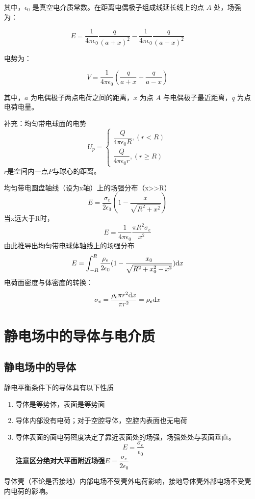 其中，$\epsilon_0$ 是真空电介质常数。在距离电偶极子组成线延长线上的点 $A$ 处，场强为：

$$ E = \frac{1}{4\pi\epsilon_0}\frac{q}{(a+x)^2} - \frac{1}{4\pi\epsilon_0}\frac{q}{(a-x)^2} $$

电势为：

$$ V = \frac{1}{4\pi\epsilon_0} \left( \frac{q}{a+x}+ \frac{q}{a-x}\right) $$

其中，$a$ 为电偶极子两点电荷之间的距离，$x$ 为点 $A$ 与电偶极子最近距离，$q$ 为点电荷电量。

补充：均匀带电球面的电势\\
\begin{equation}\label{key}
	U_p=
	\begin{cases}
		\dfrac{Q}{4\pi \epsilon_0 R},(r<R)\\
		\dfrac{Q}{4\pi \epsilon_0 r},(r\geq R)
	\end{cases}
\end{equation}
$r$是空间内一点$P$与球心的距离。

均匀带电圆盘轴线（设为x轴）上的场强分布（x>>R）
\begin{equation}\label{key}
	E=\dfrac{\sigma_e}{2\epsilon_0}(1-\dfrac{x}{\sqrt{R^2+x^2}})
\end{equation}
当x远大于R时，
\begin{equation}\label{key}
E=\dfrac{1}{4\pi \epsilon_0}\dfrac{\pi R^2\sigma_e}{x^2}
\end{equation}
由此推导出均匀带电球体轴线上的场强分布
\begin{equation}\label{key}
	E=\int_{-R}^{R}\dfrac{\rho_e}{2\epsilon_0}(1-\dfrac{x_0}{\sqrt{R^2+x_0^2-x^2}})\mathrm{d} x
\end{equation}
电荷面密度与体密度的转换：
\begin{equation}\label{key}
	\sigma_e=\dfrac{\rho_e \pi r^2 \mathrm{d} x}{\pi r^2}=\rho_e\mathrm{d} x
\end{equation}

\section{静电场中的导体与电介质}
\subsection{静电场中的导体}
静电平衡条件下的导体具有以下性质
\begin{enumerate}
	\item 导体是等势体，表面是等势面
	\item 导体内部没有电荷；对于空腔导体，空腔内表面也无电荷
	\item 导体表面的面电荷密度决定了靠近表面处的场强，场强处处与表面垂直。
	\begin{equation}\label{key}
		E=\dfrac{\sigma_e}{\epsilon_0}
	\end{equation}
\textbf{注意区分绝对大平面附近场强}$ E=\dfrac{\sigma_e}{2\epsilon_0} $
\end{enumerate}
导体壳（不论是否接地）内部电场不受壳外电荷影响，接地导体壳外部电场不受壳内电荷的影响。

